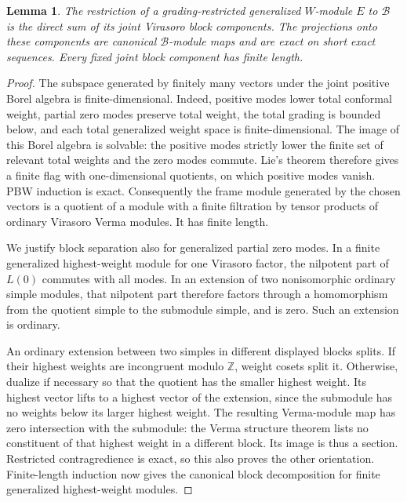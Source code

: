 \documentclass[11pt,a4paper]{article}
\numberwithin{equation}{section}
\newtheorem{lemma}[theorem]{Lemma}
\theoremstyle{definition}\newtheorem{definition}[theorem]{Definition}
\theoremstyle{remark}\newtheorem{remark}[theorem]{Remark}
\begin{document}
\begin{lemma}\label{neutral:lem:frame-blocks}
The restriction of a grading-restricted generalized $W$-module $E$
to $\mathcal B$ is the direct sum of its joint Virasoro block
components.  The projections onto these components are canonical
$\mathcal B$-module maps and are exact on short exact sequences.
Every fixed joint block component has finite length.
\end{lemma}

\begin{proof}
The subspace generated by finitely many vectors under the joint
positive Borel algebra is finite-dimensional.  Indeed, positive modes lower
total conformal weight, partial zero modes preserve total weight,
the total grading is bounded below, and each total generalized weight
space is finite-dimensional.  The image of this Borel algebra is
solvable: the positive modes strictly lower the finite set of relevant
total weights and the zero modes commute.  Lie's theorem therefore
gives a finite flag with one-dimensional quotients, on which positive
modes vanish.  PBW induction is exact.  Consequently the frame module
generated by the chosen vectors is a quotient of a module with a
finite filtration by tensor products of ordinary Virasoro Verma
modules.  It has finite length.

We justify block separation also for generalized partial zero modes.
In a finite generalized highest-weight module for one Virasoro factor,
the nilpotent part of $L(0)$ commutes with all modes.  In an extension
of two nonisomorphic ordinary simple modules, that nilpotent part
therefore factors through a homomorphism from the quotient simple to
the submodule simple, and is zero.  Such an extension is ordinary.

An ordinary extension between two simples in different displayed
blocks splits.  If their highest weights are incongruent modulo
$\mathbb Z$, weight cosets split it.  Otherwise, dualize if necessary
so that the quotient has the smaller highest weight.  Its highest
vector lifts to a highest vector of the extension, since the
submodule has no weights below its larger highest weight.  The
resulting Verma-module map has zero intersection with the submodule:
the Verma structure theorem lists no constituent of that highest
weight in a different block.  Its image is thus a section.  Restricted
contragredience is exact, so this also proves the other orientation.
Finite-length induction now gives the canonical block decomposition
for finite generalized highest-weight modules.


\end{proof}
\end{document}
